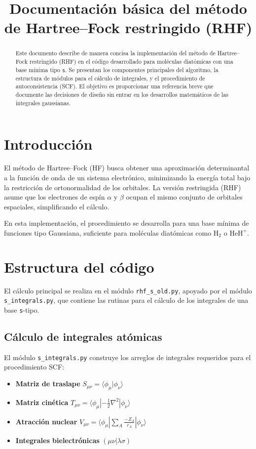 \documentclass[11pt]{article}
\title{Documentación básica del método de Hartree–Fock restringido (RHF)}
\date{}
\begin{document}
\maketitle

\begin{abstract}
Este documento describe de manera concisa la implementación del método de Hartree–Fock restringido (RHF)
en el código desarrollado para moléculas diatómicas con una base mínima tipo \texttt{s}.
Se presentan los componentes principales del algoritmo, la estructura de módulos para el cálculo de integrales,
y el procedimiento de autoconsistencia (SCF). El objetivo es proporcionar una referencia breve
que documente las decisiones de diseño sin entrar en los desarrollos matemáticos de las integrales gaussianas.
\end{abstract}

\section{Introducción}
El método de Hartree–Fock (HF) busca obtener una aproximación determinantal a la función de onda
de un sistema electrónico, minimizando la energía total bajo la restricción de ortonormalidad de los orbitales.
La versión restringida (RHF) asume que los electrones de espín $\alpha$ y $\beta$
ocupan el mismo conjunto de orbitales espaciales, simplificando el cálculo.

En esta implementación, el procedimiento se desarrolla para una base mínima de funciones tipo Gaussiana,
suficiente para moléculas diatómicas como \(\mathrm{H_2}\) o \(\mathrm{HeH^+}\).

\section{Estructura del código}
El cálculo principal se realiza en el módulo \texttt{rhf\_s\_old.py}, apoyado por el módulo \texttt{s\_integrals.py},
que contiene las rutinas para el cálculo de los integrales de una base \texttt{s}-tipo.

\subsection{Cálculo de integrales atómicas}
El módulo \texttt{s\_integrals.py} construye los arreglos de integrales requeridos para el procedimiento SCF:

\begin{itemize}
\item \textbf{Matriz de traslape} \( S_{\mu\nu} = \langle \phi_\mu | \phi_\nu \rangle \)
\item \textbf{Matriz cinética} \( T_{\mu\nu} = \langle \phi_\mu | -\frac{1}{2}\nabla^2 | \phi_\nu \rangle \)
\item \textbf{Atracción nuclear} \( V_{\mu\nu} = \langle \phi_\mu | \sum_A \frac{-Z_A}{r_A} | \phi_\nu \rangle \)
\item \textbf{Integrales bielectrónicas} \((\mu\nu|\lambda\sigma)\)
\end{itemize}
\end{document}

